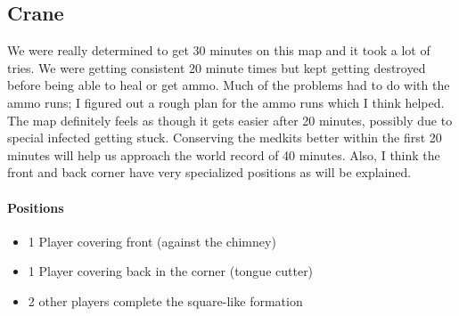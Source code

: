 \subsection{Crane}
We were really determined to get 30 minutes on this map and it took a lot of tries. We were getting consistent 20 minute times but kept getting destroyed before being able to heal or get ammo. Much of the problems had to do with the ammo runs; I figured out a rough plan for the ammo runs which I think helped. The map definitely feels as though it gets easier after 20 minutes, possibly due to special infected getting stuck. Conserving the medkits better within the first 20 minutes will help us approach the world record of 40 minutes. Also, I think the front and back corner have very specialized positions as will be explained.

\paragraph{Positions}
\begin{itemize}
\item 1 Player covering front (against the chimney)
\item 1 Player covering back in the corner (tongue cutter)
\item 2 other players complete the square-like formation
\end{itemize}

